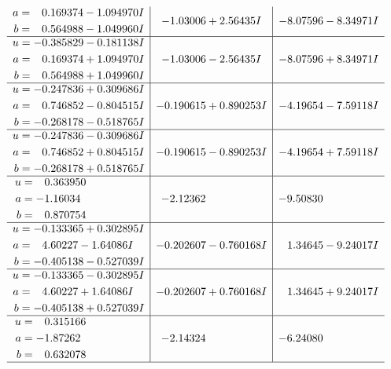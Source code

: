 \documentclass[1p]{elsarticle_modified}
\theoremstyle{definition}
\begin{document}
$$\begin{array}{c|c|c}
\begin{aligned}
a &= \phantom{-}0.169374 - 1.094970 I \\
b &= \phantom{-}0.564988 - 1.049960 I\end{aligned}
 & -1.03006 + 2.56435 I & -8.07596 - 8.34971 I \\ \hline\begin{aligned}
u &= -0.385829 - 0.181138 I \\
a &= \phantom{-}0.169374 + 1.094970 I \\
b &= \phantom{-}0.564988 + 1.049960 I\end{aligned}
 & -1.03006 - 2.56435 I & -8.07596 + 8.34971 I \\ \hline\begin{aligned}
u &= -0.247836 + 0.309686 I \\
a &= \phantom{-}0.746852 - 0.804515 I \\
b &= -0.268178 - 0.518765 I\end{aligned}
 & -0.190615 + 0.890253 I & -4.19654 - 7.59118 I \\ \hline\begin{aligned}
u &= -0.247836 - 0.309686 I \\
a &= \phantom{-}0.746852 + 0.804515 I \\
b &= -0.268178 + 0.518765 I\end{aligned}
 & -0.190615 - 0.890253 I & -4.19654 + 7.59118 I \\ \hline\begin{aligned}
u &= \phantom{-}0.363950\phantom{ +0.000000I} \\
a &= -1.16034\phantom{ +0.000000I} \\
b &= \phantom{-}0.870754\phantom{ +0.000000I}\end{aligned}
 & -2.12362\phantom{ +0.000000I} & -9.50830\phantom{ +0.000000I} \\ \hline\begin{aligned}
u &= -0.133365 + 0.302895 I \\
a &= \phantom{-}4.60227 - 1.64086 I \\
b &= -0.405138 - 0.527039 I\end{aligned}
 & -0.202607 - 0.760168 I & \phantom{-}1.34645 - 9.24017 I \\ \hline\begin{aligned}
u &= -0.133365 - 0.302895 I \\
a &= \phantom{-}4.60227 + 1.64086 I \\
b &= -0.405138 + 0.527039 I\end{aligned}
 & -0.202607 + 0.760168 I & \phantom{-}1.34645 + 9.24017 I \\ \hline\begin{aligned}
u &= \phantom{-}0.315166\phantom{ +0.000000I} \\
a &= -1.87262\phantom{ +0.000000I} \\
b &= \phantom{-}0.632078\phantom{ +0.000000I}\end{aligned}
 & -2.14324\phantom{ +0.000000I} & -6.24080\phantom{ +0.000000I}\\
 \hline 
 \end{array}$$\newpage
\end{document}
